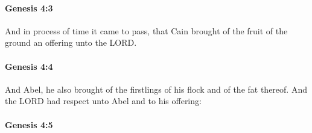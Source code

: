 
		\paragraph{Genesis 4:3} %
			\label{GENESIS-4-3}

			And in process of time it came to pass, that Cain brought of the fruit of the ground an offering unto the LORD.


		\paragraph{Genesis 4:4} %
			\label{GENESIS-4-4}

			And Abel, he also brought of the firstlings of his flock and of the fat thereof.  And the LORD had respect unto Abel and to his offering:


		\paragraph{Genesis 4:5} %
			\label{GENESIS-4-5}

